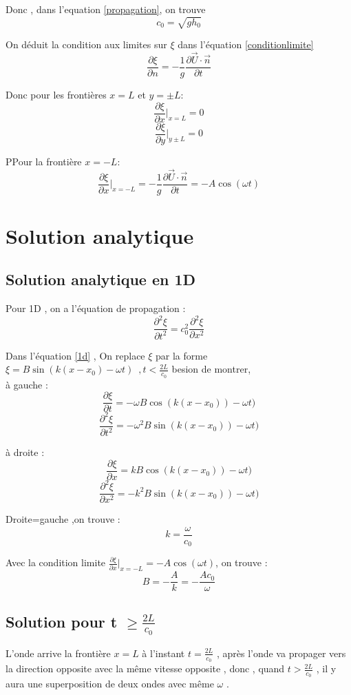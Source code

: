 \documentclass[a4paper,10pt]{report} %
\begin{document}
Donc , dans l'equation \ref{propagation}, on trouve
 $$c_0=\sqrt{gh_0}$$

On déduit la condition aux limites sur $\xi$ dans l'équation \ref{conditionlimite}
\begin{equation}
\frac{\partial \xi}{\partial n}=-\frac{1}{g}\frac{\partial\vec{U}\cdot\vec{n}}{\partial t}
\end{equation}

Donc pour les frontières $x=L$ et $y=\pm L$:
$$\frac{\partial \xi}{\partial x}\Big|_{x=L}=0$$
$$\frac{\partial \xi}{\partial y}\Big|_{y\pm L}=0$$

PPour la frontière $x=-L$:
$$\frac{\partial \xi}{\partial x}\Big|_{x=-L}=-\frac{1}{g}\frac{\partial\vec{U}\cdot\vec{n}}{\partial t}=-A\cos(\omega t)$$

\chapter{Solution analytique } 
\section{Solution analytique en \textbf{1D}}
Pour 1D , on a l'équation de propagation :
\begin{equation}
\frac{\partial ^2\xi}{\partial t^2}=c_0^2\frac{\partial ^2\xi}{\partial x^2}
\label{1d}
\end{equation}

Dans l'équation \ref{1d} , On replace $\xi$ par la forme $\xi=B\sin(k(x-x_0)-\omega t)\,\,\,,t<\frac{2L}{c_0}$ besion de montrer,\\

 à gauche :
$$\frac{\partial \xi}{\partial t}=-\omega B\cos(k(x-x_0))-\omega t)$$
$$\frac{\partial^2 \xi}{\partial t^2}=-\omega^2B\sin(k(x-x_0))-\omega t)$$

à droite :
$$\frac{\partial \xi}{\partial x}=k B\cos(k(x-x_0))-\omega t)$$
$$\frac{\partial^2 \xi}{\partial x^2}=-k^2B\sin(k(x-x_0))-\omega t)$$

Droite=gauche ,on trouve :
$$k=\frac{\omega}{c_0}$$

Avec la condition limite $\frac{\partial \xi}{\partial x}\Big|_{x=-L}=-A\cos(\omega t)$, on trouve :
$$B=-\frac{A}{k}=-\frac{Ac_0}{\omega}$$

\section{Solution pour t $\geq\frac{2L}{c_0}$}
L'onde arrive la frontière $x=L$ à l'instant $t=\frac{2L}{c_0}$ , après l'onde va propager vers la direction opposite avec la même vitesse opposite , donc , quand $t>\frac{2L}{c_0}$ , il y aura une superposition de deux ondes avec même $\omega$ .
\end{document}
